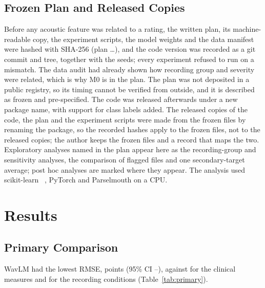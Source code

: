 \documentclass[journal]{IEEEtran}
\begin{document}
\subsection{Frozen Plan and Released Copies}\label{sec:frozen}
Before any acoustic feature was related to a rating, the written plan, its machine-readable copy, the experiment scripts, the model weights and the data manifest were hashed with SHA-256 (plan \analysisPlanSha{}\ldots), and the code version was recorded as a git commit and tree, together with the seeds; every experiment refused to run on a mismatch. The data audit had already shown how recording group and severity were related, which is why M0 is in the plan. The plan was not deposited in a public registry, so its timing cannot be verified from outside, and it is described as frozen and pre-specified. The code was released afterwards under a new package name, with support for class labels added. The released copies of the code, the plan and the experiment scripts were made from the frozen files by renaming the package, so the recorded hashes apply to the frozen files, not to the released copies; the author keeps the frozen files and a record that maps the two. Exploratory analyses named in the plan appear here as the recording-group and sensitivity analyses, the comparison of flagged files and one secondary-target average; post hoc analyses are marked where they appear. The analysis used scikit-learn \versionScikitLearn{}~\cite{pedregosa2011scikit}, PyTorch \versionTorch{} and Parselmouth \versionPraatParselmouth{} on a CPU.

\section{Results}\label{sec:results}

\subsection{Primary Comparison}\label{sec:primary}
WavLM had the lowest RMSE, \eoneAfiveRmse{} points (95\% CI \eoneAfiveRmseLow{}--\eoneAfiveRmseHigh{}), against \eoneAthreeRmse{} for the clinical measures and \eoneMzeroRmse{} for the recording conditions (Table~\ref{tab:primary}).

\begin{table}[!t]
\centering
\caption{Primary Results on the Sustained /a/ ($N=\filesPrimary{}$). RMSE in CAPE-V Points With Bootstrap 95\% CI; $\Delta_{\mathrm{rater}}$ Is the Model RMSE Minus the Single-Rater RMSE Against the Same References}
\label{tab:primary}

\end{table}
\end{document}
